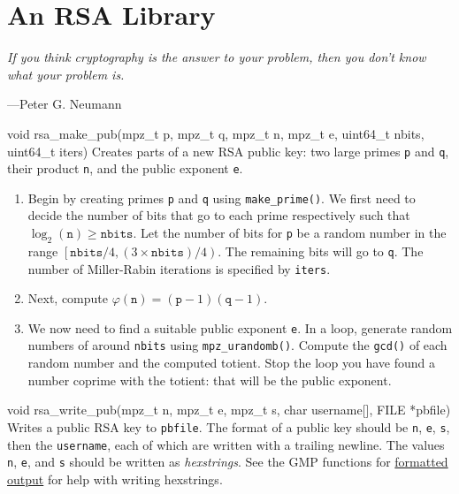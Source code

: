 \section{An RSA Library}
\epigraph{\emph{If you think cryptography is the answer to your problem, then you don't know what your problem is.}}{---Peter G.\xspace Neumann}

\noindent
\begin{funcdoc}{void rsa\_make\_pub(mpz\_t p, mpz\_t q, mpz\_t n, mpz\_t e,
uint64\_t nbits, uint64\_t iters)}
  Creates parts of a new RSA public key: two large primes \texttt{p} and
  \texttt{q}, their product \texttt{n}, and the public exponent
  \texttt{e}.

  \begin{enumerate}
    \item Begin by creating primes \texttt{p} and \texttt{q} using
      \texttt{make\_prime()}. We first need to decide the number of bits
      that go to each prime respectively such that $\log_2(\texttt{n})
      \ge \texttt{nbits}$. Let the number of bits for \texttt{p} be a
                  random number in the range
                  $\left [\texttt{nbits}/{4}, (3 \times \texttt{nbits})/{4} \right )$.
                  The remaining bits will go to
      \texttt{q}. The number of Miller-Rabin iterations is specified by
      \texttt{iters}.
    \item Next, compute $\varphi(\texttt{n}) = (\texttt{p} -
      1)(\texttt{q} - 1)$.
    \item We now need to find a suitable public exponent \texttt{e}. In
      a loop, generate random numbers of around \texttt{nbits} using
      \texttt{mpz\_urandomb()}. Compute the \texttt{gcd()} of each
      random number and the computed totient. Stop the loop you have
      found a number coprime with the totient: that will be the public
      exponent.
  \end{enumerate}
\end{funcdoc}

\begin{funcdoc}{void rsa\_write\_pub(mpz\_t n, mpz\_t e, mpz\_t
s, char username[], FILE *pbfile)}
  Writes a public RSA key to \texttt{pbfile}. The format of a public key
  should be \texttt{n}, \texttt{e}, \texttt{s}, then the
  \texttt{username}, each of which are written with a trailing newline.
  The values \texttt{n}, \texttt{e}, and \texttt{s} should be written as
  \emph{hexstrings}. See the GMP functions for
  \href{https://gmplib.org/manual/Formatted-Output-Functions}{formatted
  output} for help with writing hexstrings.
\end{funcdoc}

